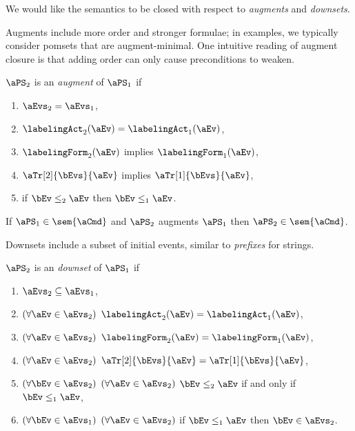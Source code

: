 We would like the semantics to be closed with respect to \emph{augments} and
\emph{downsets}.

Augments include more order and stronger formulae; in examples, we typically
consider pomsets that are augment-minimal.  One intuitive reading of augment
closure is that adding order can only cause preconditions to weaken.
\begin{definition}
  \label{def:augment}
  $\aPS_2$ is an \emph{augment} of $\aPS_1$ if
  \begin{enumerate}
  \item $\aEvs_2=\aEvs_1$,
  \item $\labelingAct_2(\aEv)=\labelingAct_1(\aEv)$,
  \item $\labelingForm_2(\aEv)$ implies $\labelingForm_1(\aEv)$,
  \item $\aTr[2]{\bEvs}{\aEv}$ implies $\aTr[1]{\bEvs}{\aEv}$,
  \item if $\bEv\le_2\aEv$ then $\bEv\le_1\aEv$.
  \end{enumerate}
\end{definition}

\begin{proposition}
  If $\aPS_1\in\sem{\aCmd}$ and $\aPS_2$  augments $\aPS_1$ then $\aPS_2\in\sem{\aCmd}$.
\end{proposition}

Downsets include a subset of initial events, similar to \emph{prefixes} for
strings.
\begin{definition}
  \label{def:downset}
  $\aPS_2$ is an \emph{downset} of $\aPS_1$ if
  \begin{enumerate}
  \item $\aEvs_2\subseteq\aEvs_1$,
  \item $(\forall \aEv\in\aEvs_2)$ $\labelingAct_2(\aEv)=\labelingAct_1(\aEv)$,
  \item $(\forall \aEv\in\aEvs_2)$ $\labelingForm_2(\aEv)=\labelingForm_1(\aEv)$,
  \item $(\forall \aEv\in\aEvs_2)$ $\aTr[2]{\bEvs}{\aEv}=\aTr[1]{\bEvs}{\aEv}$,
  \item $(\forall \bEv\in\aEvs_2)$ $(\forall \aEv\in\aEvs_2)$ $\bEv\le_2\aEv$ if and only if $\bEv\le_1\aEv$,
  \item $(\forall \bEv\in\aEvs_1)$ $(\forall \aEv\in\aEvs_2)$ if $\bEv\le_1\aEv$ then $\bEv\in\aEvs_2$.
  \end{enumerate}
\end{definition}

